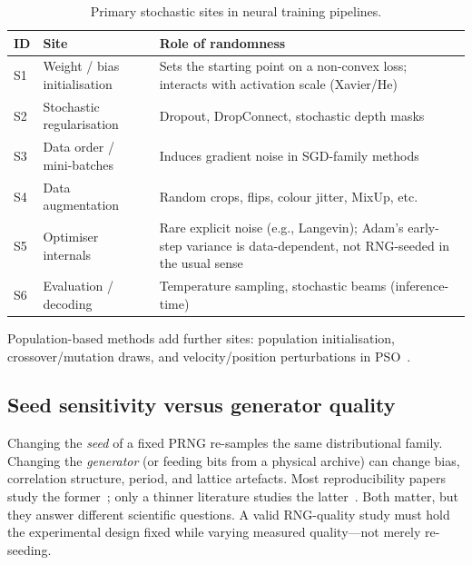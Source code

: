 \begin{table}[t]
\centering
\caption{Primary stochastic sites in neural training pipelines.}
\label{tab:sites}
\begin{tabular}{@{}llp{6.2cm}@{}}
\toprule
\textbf{ID} & \textbf{Site} & \textbf{Role of randomness} \\
\midrule
S1 & Weight / bias initialisation & Sets the starting point on a non-convex loss; interacts with activation scale (Xavier/He) \\
S2 & Stochastic regularisation & Dropout, DropConnect, stochastic depth masks \\
S3 & Data order / mini-batches & Induces gradient noise in SGD-family methods \\
S4 & Data augmentation & Random crops, flips, colour jitter, MixUp, etc. \\
S5 & Optimiser internals & Rare explicit noise (e.g., Langevin); Adam's early-step variance is data-dependent, not RNG-seeded in the usual sense~\cite{liu2020radam} \\
S6 & Evaluation / decoding & Temperature sampling, stochastic beams (inference-time) \\
\bottomrule
\end{tabular}
\end{table}

Population-based methods add further sites: population initialisation, crossover/mutation draws, and velocity/position perturbations in PSO~\cite{bastos2009pso,cantu2008rngga}.

\subsection{Seed sensitivity versus generator quality}

Changing the \emph{seed} of a fixed PRNG re-samples the same distributional family.
Changing the \emph{generator} (or feeding bits from a physical archive) can change bias, correlation structure, period, and lattice artefacts.
Most reproducibility papers study the former~\cite{picard2021torch,bethard2022seeds}; only a thinner literature studies the latter~\cite{bird2019softcomputing,koivu2022dropout,heese2024biased,antunes2025influence}.
Both matter, but they answer different scientific questions.
A valid RNG-quality study must hold the experimental design fixed while varying measured quality---not merely re-seeding.
